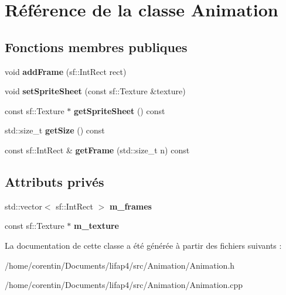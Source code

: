 \hypertarget{class_animation}{}\section{Référence de la classe Animation}
\label{class_animation}
\subsection*{Fonctions membres publiques}
\begin{DoxyCompactItemize}
\item 
\mbox{\label{class_animation_a486ee5fa2d40ae90f227a19866998c91}} 
void {\bfseries add\+Frame} (sf\+::\+Int\+Rect rect)
\item 
\mbox{\label{class_animation_a2fb16f452a323d51a0104c0aa454cab3}} 
void {\bfseries set\+Sprite\+Sheet} (const sf\+::\+Texture \&texture)
\item 
\mbox{\label{class_animation_abf4f00f8b1657829583d7d92e71b93d1}} 
const sf\+::\+Texture $\ast$ {\bfseries get\+Sprite\+Sheet} () const
\item 
\mbox{\label{class_animation_ac6854dc96e9fc8ffd97feba43547c869}} 
std\+::size\+\_\+t {\bfseries get\+Size} () const
\item 
\mbox{\label{class_animation_a8cf30a3b19ba104eeb34b08f45cfabe2}} 
const sf\+::\+Int\+Rect \& {\bfseries get\+Frame} (std\+::size\+\_\+t n) const
\end{DoxyCompactItemize}
\subsection*{Attributs privés}
\begin{DoxyCompactItemize}
\item 
\mbox{\label{class_animation_a9fda6f88df54be6bf6f16f56759f7c64}} 
std\+::vector$<$ sf\+::\+Int\+Rect $>$ {\bfseries m\+\_\+frames}
\item 
\mbox{\label{class_animation_a05b982144c4bc6124116ab5693f071d3}} 
const sf\+::\+Texture $\ast$ {\bfseries m\+\_\+texture}
\end{DoxyCompactItemize}


La documentation de cette classe a été générée à partir des fichiers suivants \+:\begin{DoxyCompactItemize}
\item 
/home/corentin/\+Documents/lifap4/src/\+Animation/Animation.\+h\item 
/home/corentin/\+Documents/lifap4/src/\+Animation/Animation.\+cpp\end{DoxyCompactItemize}
